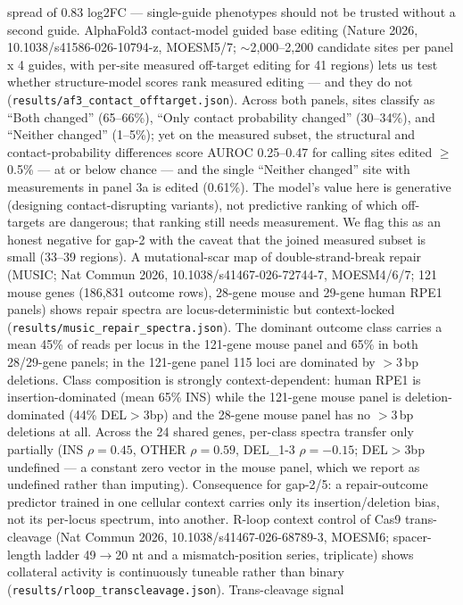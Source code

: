 \documentclass[12pt]{article}
\begin{document}
spread of 0.83 log2FC --- single-guide phenotypes should not be
trusted without a second guide.
AlphaFold3 contact-model guided base editing (Nature 2026,
10.1038/s41586-026-10794-z, MOESM5/7; $\sim$2{,}000--2{,}200 candidate
sites per panel x 4 guides, with per-site measured off-target editing
for 41 regions) lets us test whether structure-model scores rank
measured editing --- and they do not
(\texttt{results/af3\_contact\_offtarget.json}). Across both panels,
sites classify as ``Both changed'' (65--66\%), ``Only contact
probability changed'' (30--34\%), and ``Neither changed''
(1--5\%); yet on the measured subset, the structural and
contact-probability differences score AUROC 0.25--0.47 for calling
sites edited $\geq$0.5\% --- at or below chance --- and the single
``Neither changed'' site with measurements in panel 3a is edited
(0.61\%). The model's value here is generative (designing
contact-disrupting variants), not predictive ranking of which
off-targets are dangerous; that ranking still needs measurement. We
flag this as an honest negative for gap-2 with the caveat that the
joined measured subset is small (33--39 regions).
A mutational-scar map of double-strand-break repair (MUSIC; Nat
Commun 2026, 10.1038/s41467-026-72744-7, MOESM4/6/7; 121 mouse genes
(186{,}831 outcome rows), 28-gene mouse and 29-gene human RPE1
panels) shows repair spectra are locus-deterministic but
context-locked (\texttt{results/music\_repair\_spectra.json}).
The dominant outcome class carries a mean 45\% of reads per locus in
the 121-gene mouse panel and 65\% in both 28/29-gene panels; in the
121-gene panel 115 loci are dominated by $>$3\,bp deletions. Class
composition is strongly context-dependent: human RPE1 is
insertion-dominated (mean 65\% INS) while the 121-gene mouse panel is
deletion-dominated (44\% DEL$>$3bp) and the 28-gene mouse panel has
no $>$3\,bp deletions at all. Across the 24 shared genes, per-class
spectra transfer only partially (INS $\rho=0.45$, OTHER
$\rho=0.59$, DEL\_1-3 $\rho=-0.15$; DEL$>$3bp undefined --- a
constant zero vector in the mouse panel, which we report as undefined
rather than imputing). Consequence for gap-2/5: a repair-outcome
predictor trained in one cellular context carries only its
insertion/deletion bias, not its per-locus spectrum, into another.
R-loop context control of Cas9 trans-cleavage (Nat Commun 2026,
10.1038/s41467-026-68789-3, MOESM6; spacer-length ladder 49$\to$20 nt
and a mismatch-position series, triplicate) shows collateral activity
is continuously tuneable rather than binary
(\texttt{results/rloop\_transcleavage.json}). Trans-cleavage signal
\end{document}
